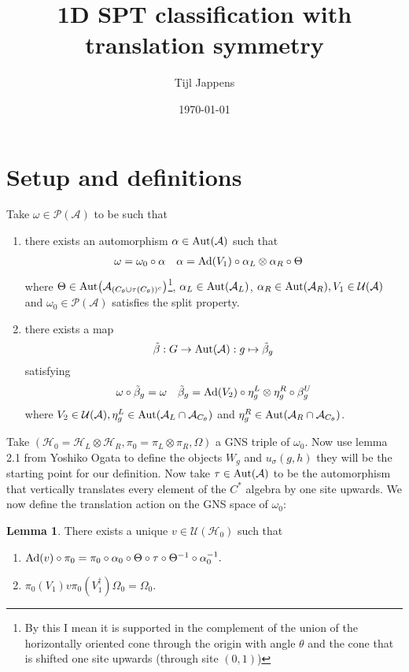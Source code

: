 \documentclass[12pt,a4paper,twoside]{article}
\title{1D SPT classification with translation symmetry}
\author{Tijl Jappens}
\date{\today}
\let\originalleft\left
\let\originalright\right
\renewcommand{\left}{\mathopen{}\mathclose\bgroup\originalleft}
\renewcommand{\right}{\aftergroup\egroup\originalright}
\newcommand{\UU}{\mathcal U}
\newcommand{\PP}{\mathcal P}
\newcommand{\HH}{\mathcal H}
\renewcommand{\AA}{\mathcal A}
\newcommand{\Ad}[1]{\textrm{Ad}\left(#1\right)}
\newcommand{\Aut}[1]{\textrm{Aut}\left(#1\right)}
\theoremstyle{definition}
\newtheorem{lemma}[theorem]{Lemma}
\numberwithin{equation}{section}
\begin{document}
\section{Setup and definitions}
Take $\omega\in\PP(\AA)$ to be such that
\begin{enumerate}
	\item  there exists an automorphism $\alpha\in\Aut{\AA}$ such that
	\begin{align}
		\omega&=\omega_0\circ\alpha&\alpha&=\Ad{V_1}\circ\alpha_L\otimes\alpha_R\circ\Theta
	\end{align}
	where $\Theta\in\Aut{\AA_{(C_\theta\cup \tau(C_\theta))^c}}$\footnote{By this I mean it is supported in the complement of the union of the horizontally oriented cone through the origin with angle $\theta$ and the cone that is shifted one site upwards (through site $(0,1)$)}, $\alpha_L\in\Aut{\AA_L}$, $\alpha_R\in\Aut{\AA_R},V_1\in\UU(\AA)$ and $\omega_0\in\PP(\AA)$ satisfies the split property.
	\item there exists a map
	\begin{equation}
		\tilde\beta:G\rightarrow\Aut{\AA}:g\mapsto\tilde\beta_g
	\end{equation}
	satisfying
	\begin{align}
		\omega\circ\tilde\beta_g&=\omega&\tilde\beta_g=\Ad{V_2}\circ\eta^L_g\otimes\eta^R_g\circ\beta^U_g
	\end{align}
	where $V_2\in\UU(\AA),\eta^L_g\in\Aut{\AA_L\cap\AA_{C_\theta}}$ and $\eta^R_g\in\Aut{\AA_R\cap\AA_{C_\theta}}$.
\end{enumerate}
Take $(\HH_0=\HH_L\otimes\HH_R,\pi_0=\pi_L\otimes\pi_R,\Omega)$ a GNS triple of $\omega_0$. Now use lemma 2.1 from Yoshiko Ogata \cite{ogata2021h3gmathbb} to define the objects $W_g$ and $u_\sigma(g,h)$ they will be the starting point for our definition. Now take $\tau\in\Aut{\AA}$ to be the automorphism that vertically translates every element of the $C^*$ algebra by one site upwards. We now define the translation action on the GNS space of $\omega_0$:
\begin{lemma}
	There exists a unique $v\in\UU(\HH_0)$ such that
	\begin{enumerate}
		\item $\Ad{v}\circ\pi_0=\pi_0\circ\alpha_0\circ\Theta\circ\tau\circ\Theta^{-1}\circ\alpha_0^{-1}.$
		\item $\pi_0(V_1)v\pi_0(V_1^\dagger)\Omega_0=\Omega_0.$
	\end{enumerate}
\end{lemma}
\end{document}
